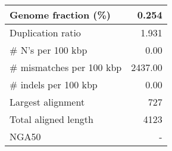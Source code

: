 \documentclass[12pt,a4paper]{article}
\begin{document}
\begin{table}[ht]
\begin{center}
\begin{tabular}{|l*{1}{|r}|}
Genome fraction (\%) & 0.254 \\ \hline
Duplication ratio & 1.931 \\ \hline
\# N's per 100 kbp & 0.00 \\ \hline
\# mismatches per 100 kbp & 2437.00 \\ \hline
\# indels per 100 kbp & 0.00 \\ \hline
Largest alignment & 727 \\ \hline
Total aligned length & 4123 \\ \hline
NGA50 & - \\ \hline
\end{tabular}
\end{center}
\end{table}
\end{document}
